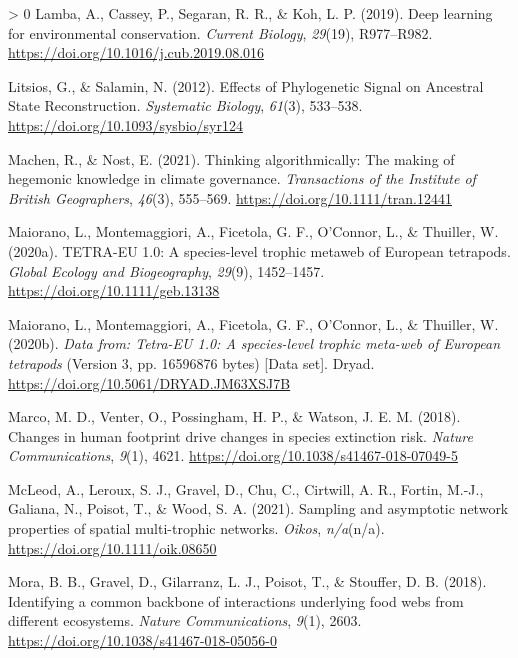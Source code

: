 \documentclass[10pt,oneside]{article}
\newlength{\cslhangindent}
\newenvironment{CSLReferences}[3] %
 {%
  \setlength{\parindent}{0pt}
  \ifodd #1 \everypar{\setlength{\hangindent}{\cslhangindent}}\ignorespaces\fi
  \ifnum #2 > 0
  \setlength{\parskip}{#2\baselineskip}
  \fi
 }%
 {}
\begin{document}
\begin{CSLReferences}{1}{0}
\leavevmode\hypertarget{ref-Lamba2019DeeLea}{}%
Lamba, A., Cassey, P., Segaran, R. R., \& Koh, L. P. (2019). Deep
learning for environmental conservation. \emph{Current Biology},
\emph{29}(19), R977--R982.
\url{https://doi.org/10.1016/j.cub.2019.08.016}

\leavevmode\hypertarget{ref-Litsios2012EffPhy}{}%
Litsios, G., \& Salamin, N. (2012). Effects of Phylogenetic Signal on
Ancestral State Reconstruction. \emph{Systematic Biology}, \emph{61}(3),
533--538. \url{https://doi.org/10.1093/sysbio/syr124}

\leavevmode\hypertarget{ref-Machen2021ThiAlg}{}%
Machen, R., \& Nost, E. (2021). Thinking algorithmically: The making of
hegemonic knowledge in climate governance. \emph{Transactions of the
Institute of British Geographers}, \emph{46}(3), 555--569.
\url{https://doi.org/10.1111/tran.12441}

\leavevmode\hypertarget{ref-Maiorano2020Tet10}{}%
Maiorano, L., Montemaggiori, A., Ficetola, G. F., O'Connor, L., \&
Thuiller, W. (2020a). TETRA-EU 1.0: A species-level trophic metaweb of
European tetrapods. \emph{Global Ecology and Biogeography},
\emph{29}(9), 1452--1457. \url{https://doi.org/10.1111/geb.13138}

\leavevmode\hypertarget{ref-Maiorano2020DatTet}{}%
Maiorano, L., Montemaggiori, A., Ficetola, G. F., O'Connor, L., \&
Thuiller, W. (2020b). \emph{Data from: Tetra-EU 1.0: A species-level
trophic meta-web of European tetrapods} (Version 3, pp. 16596876 bytes)
{[}Data set{]}. Dryad. \url{https://doi.org/10.5061/DRYAD.JM63XSJ7B}

\leavevmode\hypertarget{ref-Marco2018ChaHum}{}%
Marco, M. D., Venter, O., Possingham, H. P., \& Watson, J. E. M. (2018).
Changes in human footprint drive changes in species extinction risk.
\emph{Nature Communications}, \emph{9}(1), 4621.
\url{https://doi.org/10.1038/s41467-018-07049-5}

\leavevmode\hypertarget{ref-McLeod2021SamAsy}{}%
McLeod, A., Leroux, S. J., Gravel, D., Chu, C., Cirtwill, A. R., Fortin,
M.-J., Galiana, N., Poisot, T., \& Wood, S. A. (2021). Sampling and
asymptotic network properties of spatial multi-trophic networks.
\emph{Oikos}, \emph{n/a}(n/a). \url{https://doi.org/10.1111/oik.08650}

\leavevmode\hypertarget{ref-Mora2018IdeCom}{}%
Mora, B. B., Gravel, D., Gilarranz, L. J., Poisot, T., \& Stouffer, D.
B. (2018). Identifying a common backbone of interactions underlying food
webs from different ecosystems. \emph{Nature Communications},
\emph{9}(1), 2603. \url{https://doi.org/10.1038/s41467-018-05056-0}


\end{CSLReferences}
\end{document}
